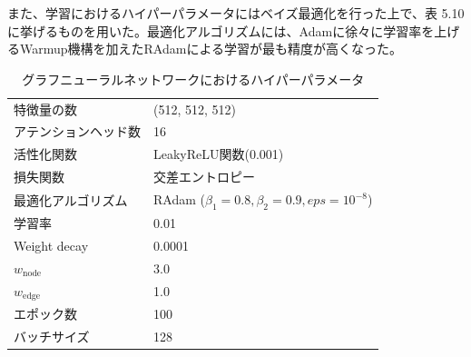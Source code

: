 また、学習におけるハイパーパラメータにはベイズ最適化を行った上で、表 5.10%
に挙げるものを用いた。最適化アルゴリズムには、Adamに徐々に学習率を上げるWarmup機構を加えたRAdamによる学習が最も精度が高くなった。
\begin{table}[H]
 \centering
  \begin{tabular}{ l  l }
   \hline
   特徴量の数 & (512, 512, 512)\\
   アテンションヘッド数 & 16\\
   活性化関数 & LeakyReLU関数(0.001)\\
   損失関数 & 交差エントロピー\\
   最適化アルゴリズム & RAdam ($\beta_1 = 0.8, \beta_2 = 0.9, eps = 10^{-8}$)\\
   学習率 & 0.01\\
   Weight decay & 0.0001\\
    $w_{\mathrm{node}}$ & 3.0\\
    $w_{\mathrm{edge}}$ & 1.0\\
   エポック数 & 100\\
   バッチサイズ & 128\\
   \hline
  \end{tabular}
  \label{gnnsetting}
  \caption{グラフニューラルネットワークにおけるハイパーパラメータ}
\end{table}
